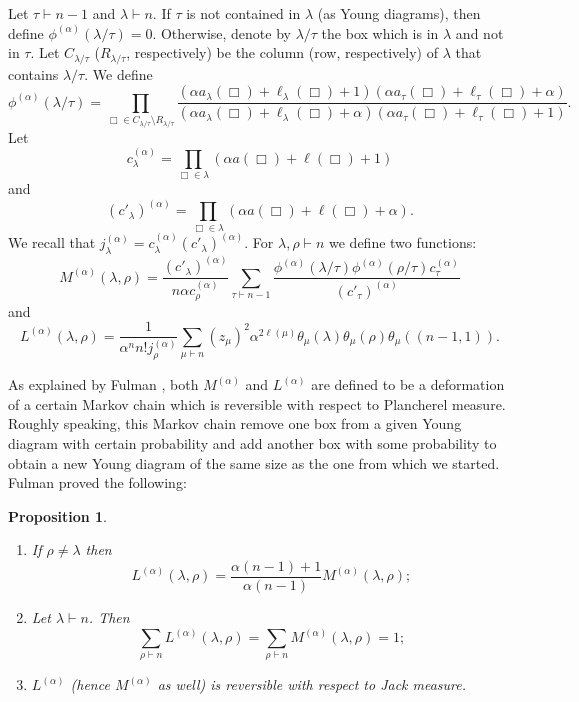 \documentclass[11pt]{amsart}
\theoremstyle{plain}
\newtheorem{proposition}[lemma]{Proposition}
\theoremstyle{remark}
\begin{document}
Let $\tau \vdash n-1$ and $\lambda \vdash n$.
If $\tau$ is not contained in $\lambda$ (as Young diagrams),
then define $\phi^{(\alpha)}(\lambda/\tau) =0$.
Otherwise, denote by $\lambda / \tau$ the box which is in $\lambda$ and not in $\tau$.
Let $C_{\lambda / \tau}$ ($R_{\lambda / \tau}$, respectively) be the column (row, respectively)
of $\lambda$ that contains $\lambda / \tau$.
We define
\[ \phi^{(\alpha)}(\lambda/\tau) = \prod_{\Box \in C_{\lambda / \tau} \setminus R_{\lambda / \tau}} \frac{(\alpha a_\lambda(\Box) + \ell_\lambda(\Box)
+1) 
(\alpha a_\tau(\Box) + \ell_\tau(\Box)+\alpha)}{(\alpha a_\lambda(\Box) + \ell_\lambda(\Box)
+\alpha) 
(\alpha a_\tau(\Box) + \ell_\tau(\Box)+1)}.\]
Let
\[ c_\lambda^{(\alpha)} = \prod_{\Box \in \lambda} (\alpha a(\Box) + \ell(\Box)
+1)\]
and
\[ (c'_\lambda)^{(\alpha)} = \prod_{\Box \in \lambda} (\alpha a(\Box) + \ell(\Box)
+\alpha).\]
We recall that $j_\lambda^{(\alpha)}=c_\lambda^{(\alpha)}(c'_\lambda)^{(\alpha)}.$
For $\lambda, \rho \vdash n$ we define two functions:
\begin{equation}
\label{eq:TransitionM}
M^{(\alpha)}(\lambda,\rho) = \frac{(c'_\lambda)^{(\alpha)}}{n \alpha c_\rho^{(\alpha)}} \sum_{\tau \vdash n-1} \frac{\phi^{(\alpha)}(\lambda/\tau)\phi^{(\alpha)}(\rho/\tau) c_\tau^{(\alpha)}}{(c'_\tau)^{(\alpha)}}
\end{equation}
and
\begin{equation}
\label{eq:TransitionL}
L^{(\alpha)}(\lambda,\rho) = \frac{1}{\alpha^n n! j_\rho^{(\alpha)}}\sum_{\mu \vdash n}(z_\mu)^2 \alpha^{2\ell(\mu)}\theta_\mu(\lambda)\theta_\mu(\rho)\theta_\mu((n-1,1)).
\end{equation}

As explained by Fulman \cite{FulmanFluctuationChA2}, 
both $M^{(\alpha)}$ and $L^{(\alpha)}$ are defined to be a deformation of a certain Markov chain which is reversible with respect to Plancherel measure. Roughly speaking, this Markov chain remove one box from a given Young diagram with certain probability and add another box with some probability to obtain a new Young diagram of the same size as the one from which we started. Fulman \cite{FulmanFluctuationChA2} proved the following:

\begin{proposition}{\cite[Section 4]{FulmanFluctuationChA2}}
\label{prop:FulmanComputations}
\begin{enumerate}
\item
If $\rho \neq \lambda$ then
\[ L^{(\alpha)}(\lambda,\rho) = \frac{\alpha(n-1) + 1}{\alpha(n-1)} M^{(\alpha)}(\lambda,\rho);\]
\item
Let $\lambda \vdash n$. Then
\[ \sum_{\rho \vdash n} L^{(\alpha)}(\lambda, \rho) = \sum_{\rho \vdash n} M^{(\alpha)}(\lambda, \rho) = 1; \]
\item
$L^{(\alpha)}$ (hence $M^{(\alpha)}$ as well) is reversible with respect to Jack measure.
\end{enumerate}
\end{proposition}
\end{document}
